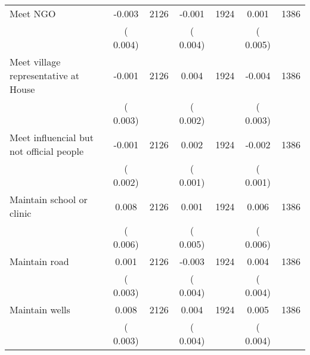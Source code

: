 \begin{tabular}{l*{6}{c}}
Meet NGO        &             -0.003      &       2126       &             -0.001      &       1924       &              0.001      &       1386       \\
                       &       (       0.004)            &                               &       (       0.004)            &                               &       (       0.005)            &                               \\
Meet village representative at House        &             -0.001      &       2126       &              0.004      &       1924       &             -0.004      &       1386       \\
                       &       (       0.003)            &                               &       (       0.002)            &                               &       (       0.003)            &                               \\
Meet influencial but not official people        &             -0.001      &       2126       &              0.002      &       1924       &             -0.002      &       1386       \\
                       &       (       0.002)            &                               &       (       0.001)            &                               &       (       0.001)            &                               \\
Maintain school or clinic        &              0.008      &       2126       &              0.001      &       1924       &              0.006      &       1386       \\
                       &       (       0.006)            &                               &       (       0.005)            &                               &       (       0.006)            &                               \\
Maintain road        &              0.001      &       2126       &             -0.003      &       1924       &              0.004      &       1386       \\
                       &       (       0.003)            &                               &       (       0.004)            &                               &       (       0.004)            &                               \\
Maintain wells        &              0.008      &       2126       &              0.004      &       1924       &              0.005      &       1386       \\
                       &       (       0.003)            &                               &       (       0.004)            &                               &       (       0.004)            &                               \\

\end{tabular}
